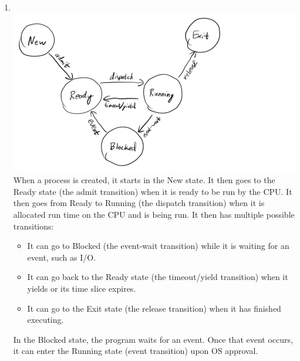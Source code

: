 \documentclass[12pt]{article}
\begin{document}
\begin{enumerate}
\begin{enumerate}
                  \item \(\)\\ \includegraphics[scale=0.5]{1-q7a} When a process is created, it starts in the New state. It then goes to the Ready state (the admit transition) when it is ready to be run by the CPU. It then goes from Ready to Running (the dispatch transition) when it is allocated run time on the CPU and is being run. It then has multiple possible transitions:
                        \begin{itemize}
                              \item It can go to Blocked (the event-wait transition) while it is waiting for an event, such as I/O.
                              \item It can go back to the Ready state (the timeout/yield transition) when it yields or its time slice expires.
                              \item It can go to the Exit state (the release transition) when it has finished executing.
                        \end{itemize}
                        In the Blocked state, the program waits for an event. Once that event occurs, it can enter the Running state (event transition) upon OS approval.


\end{enumerate}
\end{enumerate}
\end{document}
